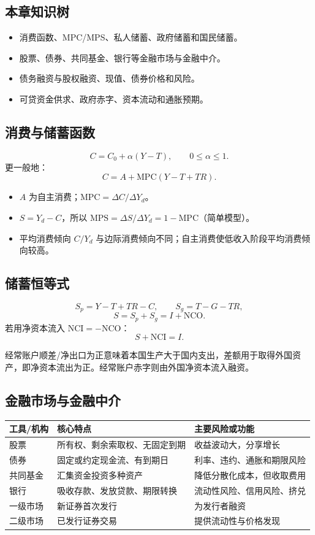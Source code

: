 \documentclass[UTF8,11pt,a4paper]{ctexart}
\newcommand{\MPC}{\mathrm{MPC}}
\newcommand{\MPS}{\mathrm{MPS}}
\newcommand{\NCO}{\mathrm{NCO}}
\newcommand{\NCI}{\mathrm{NCI}}
\begin{document}
\subsection{本章知识树}
\begin{itemize}
  \item 消费函数、MPC/MPS、私人储蓄、政府储蓄和国民储蓄。
  \item 股票、债券、共同基金、银行等金融市场与金融中介。
  \item 债务融资与股权融资、现值、债券价格和风险。
  \item 可贷资金供求、政府赤字、资本流动和通胀预期。
\end{itemize}

\subsection{消费与储蓄函数}
\[
C=C_0+\alpha(Y-T),\qquad 0\le\alpha\le1.
\]
更一般地：
\[
C=A+\MPC(Y-T+TR).
\]
\begin{itemize}
  \item $A$ 为自主消费；$\MPC=\Delta C/\Delta Y_d$。
  \item $S=Y_d-C$，所以 $\MPS=\Delta S/\Delta Y_d=1-\MPC$（简单模型）。
  \item 平均消费倾向 $C/Y_d$ 与边际消费倾向不同；自主消费使低收入阶段平均消费倾向较高。
\end{itemize}

\subsection{储蓄恒等式}
\[
S_p=Y-T+TR-C,
\qquad S_g=T-G-TR,
\]
\[
S=S_p+S_g=I+\NCO.
\]
若用净资本流入 $\NCI=-\NCO$：
\[
S+\NCI=I.
\]
\begin{detailbox}[符号直觉]
经常账户顺差/净出口为正意味着本国生产大于国内支出，差额用于取得外国资产，即净资本流出为正。经常账户赤字则由外国净资本流入融资。
\end{detailbox}

\subsection{金融市场与金融中介}
\begin{longtable}{p{}p{}p{}}
\toprule
工具/机构 & 核心特点 & 主要风险或功能\\
\midrule
股票 & 所有权、剩余索取权、无固定到期 & 收益波动大，分享增长\\
债券 & 固定或约定现金流、有到期日 & 利率、违约、通胀和期限风险\\
共同基金 & 汇集资金投资多种资产 & 降低分散化成本，但收取费用\\
银行 & 吸收存款、发放贷款、期限转换 & 流动性风险、信用风险、挤兑\\
一级市场 & 新证券首次发行 & 为发行者融资\\
二级市场 & 已发行证券交易 & 提供流动性与价格发现\\
\bottomrule
\end{longtable}
\end{document}
